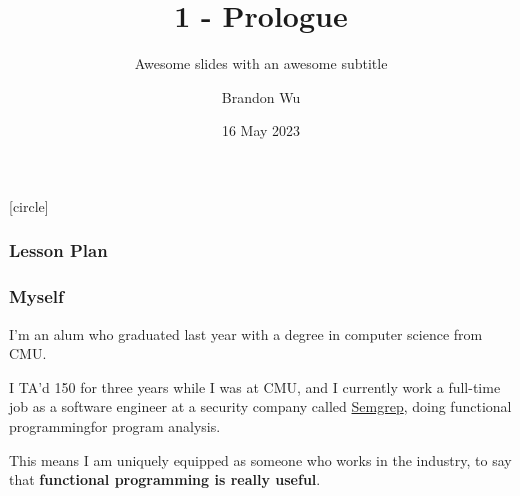 \documentclass[aspectratio=169]{beamer}
\title{1 - Prologue} %
\subtitle{Awesome slides with an awesome subtitle} %
\date{16 May 2023} %
\author{Brandon Wu} %
\newif\ifcolorlambda
\begin{document}
\ifweb
    \renewcommand{\pause}{}
\fi

[circle]

\begin{frame}[plain]
    \colorlambdatrue
    \titlepage
\end{frame}

\begin{comment}
  Future Retro from ANIMUSIC plays as students walk in
  When the music ends, BRANDON bursts in through the door

  HELLO EVERYONE! Welcome to 15-150, Principles of Functional Programming.

  I'm super excited to have all of you here. My name is Brandon Wu, and I'll be your
  primary instructor for this summer. Please call me Brandon, though confusingly
  there is also a TA named Brandon, so I guess we'll have to just figure that one out.

  To properly introduce myself, I'm actually a recent graduate of CMU, I graduated
  with my bachelor's degree in computer science last spring, and when I was in undergrad,
  I TA'd this class five times, and I was Head TA for two semesters. While I am lucky
  enough to teach this course to you this summer, I have a full-time job working  
  for a company called Semgrep in the Bay, where I actually do functional programming
  every single day.

  With intros over, let's hop to it. Today we're here to learn functional programming.
\end{comment}

\begin{frame}[fragile]
  \frametitle{Lesson Plan}

  \tableofcontents
\end{frame}


\begin{frame}[fragile]
  \frametitle{Myself}

  I'm an alum who graduated last year with a degree in computer science from CMU.

  \vspace{\fill}

  I TA'd 150 for three years while I was at CMU, and I currently work a 
  full-time job as a software engineer at a security company called 
  {\color{blue}\href{https://semgrep.dev/}{Semgrep}}, doing functional 
  programming\footnotemark for program analysis.

  \vspace{\fill}

  This means I am uniquely equipped as someone who works in the industry, to say that
  \textbf{functional programming is really useful}.

  \vspace{\fill}


\end{frame}
\end{document}
